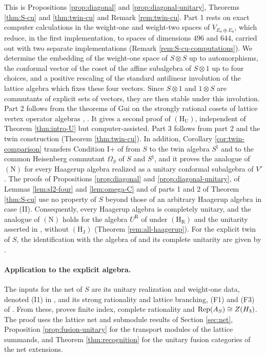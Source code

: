 \documentclass[leqno]{article}
\let\cal\relax
\newcommand{\cal}{\mathcal}
\newcommand{\ot}{\otimes}
\DeclareMathOperator{\Rep}{Rep} %
\numberwithin{equation}{section}
\begin{document}
This is Propositions \ref{prop:diagonal} and \ref{prop:diagonal-unitary}, Theorems \ref{thm:S-cu} and \ref{thm:twin-cu} and Remark \ref{rem:twin-cu}. Part 1 rests on exact computer calculations in the weight-one and weight-two spaces of $V_{E_8 \oplus E_8}$, which reduce, in the first implementation, to spaces of dimensions $496$ and $644$, carried out with two separate implementations (Remark \ref{rem:S-cu-computations}). We determine the embedding of the weight-one space of $S \ot S$ up to automorphisms, the conformal vector of the coset of the affine subalgebra of $S \ot 1$ up to four choices, and a positive rescaling of the standard antilinear involution of the lattice algebra which fixes these four vectors. Since $S \ot 1$ and $1 \ot S$ are commutants of explicit sets of vectors, they are then stable under this involution. Part 2 follows from the theorems of Gui on the strongly rational cosets of lattice vertex operator algebras \cite[Theorems 3.34 and 3.46 pp.~51 and 57]{Gui26}, \cite[Theorem 6.18 p.~70]{Gui25}. It gives a second proof of $\mathrm{(H_U)}$, independent of Theorem \ref{thm:intro-U} but computer-assisted. Part 3 follows from part 2 and the twin construction (Theorem \ref{thm:twin-cu}). In addition, Corollary \ref{cor:twin-comparison} transfers Condition I+ of \cite[Definition 6.17 p.~70]{Gui25} from $S$ to the twin algebra $S^\natural$ and to the common Heisenberg commutant $\Omega_S$ of $S$ and $S^\natural$, and it proves the analogue of $\mathrm{(N)}$ for every Haagerup algebra realized as a unitary conformal subalgebra of $V'$. The proofs of Propositions \ref{prop:diagonal} and \ref{prop:diagonal-unitary}, of Lemmas \ref{lem:sl2-four} and \ref{lem:omega-C} and of parts 1 and 2 of Theorem \ref{thm:S-cu} use no property of $S$ beyond those of an arbitrary Haagerup algebra in case (II). Consequently, every Haagerup algebra is completely unitary, and the analogue of $\mathrm{(N)}$ holds for the algebra $U^{\mathrm R}$ of \cite{Rie26} under $\mathrm{(H_R)}$ and the unitarity asserted in \cite{Rie26}, without $\mathrm{(H_J)}$ (Theorem \ref{rem:all-haagerup}). For the explicit twin of $S$, the identification with the algebra of \cite{Hua26} and its complete unitarity are given by \cite[Theorem 7.13(1)--(2)]{ArhIII}.

\paragraph{Application to the explicit algebra.} The inputs for the net of $S$ are its unitary realization and weight-one data, denoted \textup{(I1)} in \cite[Theorem 2.1]{ArhIII}, and its strong rationality and lattice branching, \textup{(F1)} and \textup{(F3)} of \cite[Theorem 2.2 and Appendix A]{ArhIII}. From these, \cite[Theorem 3.1(1)--(3)]{ArhIII} proves finite index, complete rationality and $\Rep(\cal A_S)\cong Z(\cal H_3)$. The proof uses the lattice net and submodule results of Section \ref{sec:net}, Proposition \ref{prop:fusion-unitary} for the transport modules of the lattice summands, and Theorem \ref{thm:recognition} for the unitary fusion categories of the net extensions.
\end{document}
